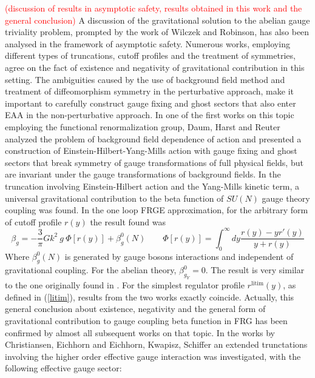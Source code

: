 \documentclass[11pt, a4paper]{article}
\begin{document}
\textcolor{red}{(discussion of results in asymptotic safety, results obtained in this work and the general conclusion)} 
A discussion of the gravitational solution to the abelian gauge triviality problem, prompted by the work of Wilczek and Robinson,
has also been analysed in the framework of asymptotic safety. Numerous works, employing different types of truncations, cutoff
profiles and the treatment of symmetries, agree on the fact of existence and negativity of gravitational contribution in this setting.
The ambiguities caused by the use of background field method and treatment
of diffeomorphism symmetry in the perturbative approach, make it important to carefully construct 
gauge fixing and ghost sectors that also enter EAA in the non-perturbative approach.
In one of the first works on this topic employing the functional renormalization group, Daum, Harst and Reuter \cite{reuter_abelian}
analyzed the problem of background field dependence of action and
presented a construction of Einstein-Hilbert-Yang-Mills action with gauge fixing and ghost sectors that
break symmetry of gauge transformations of full physical fields, but are invariant under the gauge
transformations of background fields. In the truncation involving Einstein-Hilbert action and the Yang-Mills kinetic term,
a universal gravitational contribution to the beta function of $SU(N)$ gauge theory coupling was found.
In the one loop FRGE approximation, for the arbitrary form of cutoff profile $r(y)$ the result found was
\begin{equation}
    \beta_g = - \frac{3}{\pi} Gk^2 \ g \ \Phi[r(y)] + \beta_g^0(N) \qquad \Phi[r(y)] = \int_0^{\infty} dy \frac{r(y) - y r'(y)}{y+r(y)}
\end{equation}
Where $\beta_g^0(N)$ is generated by gauge bosons interactions and independent of gravitational coupling. For the abelian theory, $\beta_{g_{Y}}^0 = 0$. The result is very similar to the one originally found in \cite{wilczek}.
For the simplest regulator profile $r^{\text{litim}}(y)$, as defined in (\ref{litim}), results from the two works exactly coincide.
Actually, this general conclusion about existence, negativity and the general form of gravitational contribution to 
gauge coupling beta function in FRG has been confirmed by almost all subsequent works on that topic.
In the works by Christiansen, Eichhorn \cite{christiansen_eichhorn} and Eichhorn, Kwapisz, Schiffer \cite{kwapisz_eichhorn} an extended trunctations involving the higher order effective
gauge interaction was investigated, with the following effective gauge sector:
\end{document}
